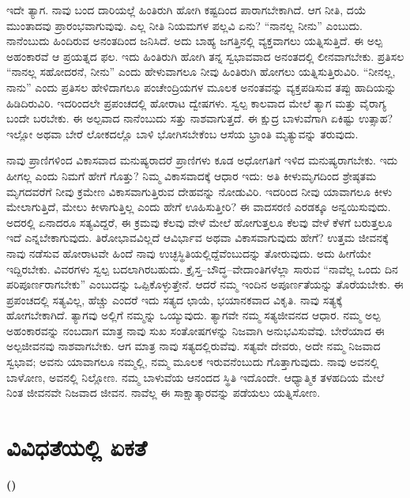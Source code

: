 \vskip 0.2cm 

ಇದೇ ತ್ಯಾಗ. ನಾವು ಬಂದ ದಾರಿಯಲ್ಲೆ ಹಿಂತಿರುಗಿ ಹೋಗಿ ಕಷ್ಟದಿಂದ ಪಾರಾಗಬೇಕಾಗಿದೆ. ಆಗ ನೀತಿ, ದಯೆ ಮುಂತಾದವು ಪ್ರಾರಂಭವಾಗುವುವು. ಎಲ್ಲ ನೀತಿ ನಿಯಮಗಳ ಪಲ್ಲವಿ ಏನು? “ನಾನಲ್ಲ ನೀನು” ಎಂಬುದು. ನಾನೆಂಬುದು ಹಿಂದಿರುವ ಅನಂತದಿಂದ ಜನಿಸಿದೆ. ಅದು ಬಾಹ್ಯ ಜಗತ್ತಿನಲ್ಲಿ ವ್ಯಕ್ತವಾಗಲು ಯತ್ನಿಸುತ್ತಿದೆ. ಈ ಅಲ್ಪ ಅಹಂಕಾರವೆ ಆ ಪ್ರಯತ್ನದ ಫಲ. ಇದು ಹಿಂತಿರುಗಿ ಹೋಗಿ ತನ್ನ ಸ್ವಭಾವವಾದ ಅನಂತದಲ್ಲಿ ಲೀನವಾಗಬೇಕು. ಪ್ರತಿಸಲ “ನಾನಲ್ಲ ಸಹೋದರನೆ, ನೀನು” ಎಂದು ಹೇಳುವಾಗಲೂ ನೀವು ಹಿಂತಿರುಗಿ ಹೋಗಲು ಯತ್ನಿಸುತ್ತಿರುವಿರಿ. “ನೀನಲ್ಲ, ನಾನು” ಎಂದು ಪ್ರತಿಸಲ ಹೇಳಿದಾಗಲೂ ಪಂಚೇಂದ್ರಿಯಗಳ ಮೂಲಕ ಅನಂತವನ್ನು ವ್ಯಕ್ತಪಡಿಸುವ ತಪ್ಪು ಹಾದಿಯನ್ನು ಹಿಡಿದಿರುವಿರಿ. ಇದರಿಂದಲೇ ಪ್ರಪಂಚದಲ್ಲಿ ಹೋರಾಟ ದ್ವೇಷಗಳು. ಸ್ವಲ್ಪ ಕಾಲವಾದ ಮೇಲೆ ತ್ಯಾಗ ಮತ್ತು ವೈರಾಗ್ಯ ಬಂದೇ ಬರಬೇಕು. ಈ ಅಲ್ಪವಾದ ನಾನೆಂಬುದು ಸತ್ತು ನಾಶವಾಗುತ್ತದೆ. ಈ ಕ್ಷುದ್ರ ಬಾಳುವೆಗಾಗಿ ಏಕಿಷ್ಟು ಉತ್ಸಾಹ? ಇಲ್ಲೋ ಅಥವಾ ಬೇರೆ ಲೋಕದಲ್ಲೊ ಬಾಳಿ ಭೋಗಿಸಬೇಕೆಂಬ ಆಸೆಯ ಭ್ರಾಂತಿ ಮೃತ್ಯುವನ್ನು ತರುವುದು.

\vskip 0.2cm 

ನಾವು ಪ್ರಾಣಿಗಳಿಂದ ವಿಕಾಸವಾದ ಮನುಷ್ಯರಾದರೆ ಪ್ರಾಣಿಗಳು ಕೂಡ ಅಧೋಗತಿಗೆ ಇಳಿದ ಮನುಷ್ಯರಾಗಬೇಕು. ಇದು ಹೀಗಲ್ಲ ಎಂದು ನಿಮಗೆ ಹೇಗೆ ಗೊತ್ತು? ನಿಮ್ಮ ವಿಕಾಸವಾದಕ್ಕೆ ಆಧಾರ ಇದು: ಅತಿ ಕೀಳುಮೃಗದಿಂದ ಶ್ರೇಷ್ಠತಮ ಮೃಗದವರೆಗೆ ನೀವು ಕ್ರಮೇಣ ವಿಕಾಸವಾಗುತ್ತಿರುವ ದೇಹವನ್ನು ನೋಡುವಿರಿ. ಇದರಿಂದ ನೀವು ಯಾವಾಗಲೂ ಕೀಳು ಮೇಲಾಗುತ್ತಿದೆ, ಮೇಲು ಕೀಳಾಗುತ್ತಿಲ್ಲ ಎಂದು ಹೇಗೆ ಊಹಿಸುತ್ತೀರಿ? ಈ ವಾದಸರಣಿ ಎರಡಕ್ಕೂ ಅನ್ವಯಿಸುವುದು. ಅದರಲ್ಲಿ ಏನಾದರೂ ಸತ್ಯವಿದ್ದರೆ, ಈ ಕ್ರಮವು ಕೆಲವು ವೇಳೆ ಮೇಲೆ ಹೋಗುತ್ತಲೂ ಕೆಲವು ವೇಳೆ ಕೆಳಗೆ ಬರುತ್ತಲೂ ಇದೆ ಎನ್ನಬೇಕಾಗುವುದು. ತಿರೋಭಾವವಿಲ್ಲದೆ ಆವಿರ್ಭಾವ ಅಥವಾ ವಿಕಾಸವಾಗುವುದು ಹೇಗೆ? ಉತ್ತಮ ಜೀವನಕ್ಕೆ ನಾವು ನಡೆಸುವ ಹೋರಾಟವೇ ಹಿಂದೆ ನಾವು ಉಚ್ಛಸ್ಥಿತಿಯಲ್ಲಿದ್ದೆವೆಂಬುದನ್ನು ತೋರುವುದು. ಅದು ಹೀಗೆಯೇ ಇದ್ದಿರಬೇಕು. ವಿವರಗಳು ಸ್ವಲ್ಪ ಬದಲಾಗಿರಬಹುದು. ಕ್ರೈಸ್ತ–ಬೌದ್ಧ–ವೇದಾಂತಿಗಳೆಲ್ಲಾ ಸಾರುವ “ನಾವೆಲ್ಲ ಒಂದು ದಿನ ಪರಿಪೂರ್ಣರಾಗಬೇಕು” ಎಂಬುದನ್ನು ಒಪ್ಪಿಕೊಳ್ಳುತ್ತೇನೆ. ಆದರೆ ನಮ್ಮ ಇಂದಿನ ಅಪೂರ್ಣತೆಯನ್ನು ತೊರೆಯಬೇಕು. ಈ ಪ್ರಪಂಚದಲ್ಲಿ ಸತ್ಯವಿಲ್ಲ, ಹೆಚ್ಚು ಎಂದರೆ ಇದು ಸತ್ಯದ ಛಾಯೆ, ಭಯಾನಕವಾದ ವಿಕೃತಿ. ನಾವು ಸತ್ಯಕ್ಕೆ ಹೋಗಬೇಕಾಗಿದೆ. ತ್ಯಾಗವು ಅಲ್ಲಿಗೆ ನಮ್ಮನ್ನು ಒಯ್ಯುವುದು. ತ್ಯಾಗವೇ ನಮ್ಮ ಸತ್ಯಜೀವನದ ಆಧಾರ. ನಮ್ಮ ಅಲ್ಪ ಅಹಂಕಾರವನ್ನು ನಂಬದಾಗ ಮಾತ್ರ ನಾವು ಸುಖ ಸಂತೋಷಗಳನ್ನು ನಿಜವಾಗಿ ಅನುಭವಿಸುವೆವು. ಬೇರೆಯಾದ ಈ ಅಲ್ಪಜೀವನವು ನಾಶವಾಗಬೇಕು. ಆಗ ಮಾತ್ರ ನಾವು ಸತ್ಯದಲ್ಲಿರುವೆವು. ಸತ್ಯವೇ ದೇವರು, ಅದೇ ನಮ್ಮ ನಿಜವಾದ ಸ್ವಭಾವ; ಅವನು ಯಾವಾಗಲೂ ನಮ್ಮಲ್ಲಿ, ನಮ್ಮ ಮೂಲಕ ಇರುವನೆಂಬುದು ಗೊತ್ತಾಗುವುದು. ನಾವು ಅವನಲ್ಲಿ ಬಾಳೋಣ, ಅವನಲ್ಲಿ ನಿಲ್ಲೋಣ. ನಮ್ಮ ಬಾಳುವೆಯ ಆನಂದದ ಸ್ಥಿತಿ ಇದೊಂದೇ. ಆಧ್ಯಾತ್ಮಿಕ ತಳಹದಿಯ ಮೇಲೆ ನಿಂತ ಜೀವನವೇ ನಿಜವಾದ ಜೀವನ. ನಾವೆಲ್ಲ ಈ ಸಾಕ್ಷಾತ್ಕಾರವನ್ನು ಪಡೆಯಲು ಯತ್ನಿಸೋಣ.

\chapter{ವಿವಿಧತೆಯಲ್ಲಿ ಏಕತೆ}%

\centerline{\textbf{(\fontsize{12pt}{14pt}\selectfont{೧೮೯೬ನೆಯ ಇಸವಿ ನವೆಂಬರ್​ ೩ ರಂದು ಲಂಡನ್ನಿನಲ್ಲಿ ನೀಡಿದ ಉಪನ್ಯಾಸ})}}

